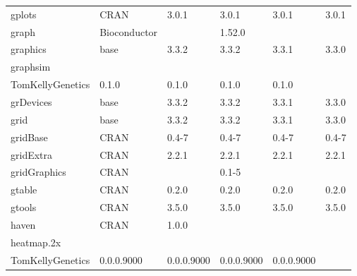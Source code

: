 \begin{longtable}{llllll}
\rowcolor{black!5}
gplots                        & CRAN                      & 3.0.1       & 3.0.1       & 3.0.1          & 3.0.1              \\
\rowcolor{black!10}
graph                         & Bioconductor              &             & 1.52.0      &                &                   \\
\rowcolor{black!5}
graphics                      & base                      & 3.3.2       & 3.3.2       & 3.3.1          & 3.3.0              \\
\rowcolor{black!10}
graphsim                      & \begin{tabular}[c]{@{}l@{}}GitHub \\ TomKellyGenetics \end{tabular}  & 0.1.0       & 0.1.0       & 0.1.0          & 0.1.0             \\
\rowcolor{black!5}
grDevices                     & base                      & 3.3.2       & 3.3.2       & 3.3.1          & 3.3.0              \\
\rowcolor{black!10}
grid                          & base                      & 3.3.2       & 3.3.2       & 3.3.1          & 3.3.0             \\
\rowcolor{black!5}
gridBase                      & CRAN                      & 0.4-7       & 0.4-7       & 0.4-7          & 0.4-7              \\
\rowcolor{black!10}
gridExtra                     & CRAN                      & 2.2.1       & 2.2.1       & 2.2.1          & 2.2.1             \\
\rowcolor{black!5}
gridGraphics                  & CRAN                      &             & 0.1-5       &                &                    \\
\rowcolor{black!10}
gtable                        & CRAN                      & 0.2.0       & 0.2.0       & 0.2.0          & 0.2.0             \\
\rowcolor{black!5}
gtools                        & CRAN                      & 3.5.0       & 3.5.0       & 3.5.0          & 3.5.0              \\
\rowcolor{black!10}
haven                         & CRAN                      & 1.0.0       &             &                &                   \\
\rowcolor{black!5}
heatmap.2x                    & \begin{tabular}[c]{@{}l@{}}GitHub \\ TomKellyGenetics \end{tabular}  & 0.0.0.9000  & 0.0.0.9000  & 0.0.0.9000     & 0.0.0.9000         \\

\end{longtable}
